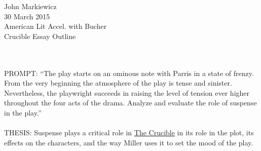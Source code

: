 \documentclass[12pt]{article}
\begin{document}
\begin{raggedleft}
	John Markiewicz \\
	30 March 2015 \\
	American Lit Accel. with Bucher \\
	Crucible Essay Outline \\ \\
\end{raggedleft}
\noindent
\\ PROMPT:  ``The play starts on an ominous note with Parris in a state of frenzy.  
From the very beginning the atmosphere of the play is tense and sinister.  
Nevertheless, the playwright succeeds in raising the level of tension ever 
higher throughout the four acts of the drama.  Analyze and evaluate the role of 
suspense in the play.''\\ \\
\noindent
THESIS: Suspense plays a critical role in \underline{The Crucible} in its 
role in the plot, its effects on the characters, and the way Miller uses it to 
set the mood of the play.\\
\end{document}

